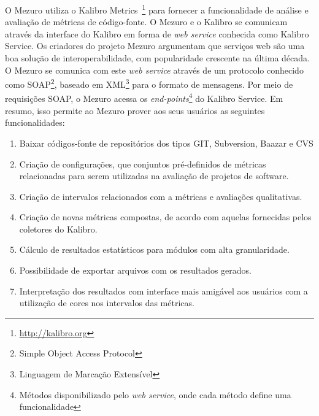 
O Mezuro utiliza o Kalibro Metrics~\footnote{\url{http://kalibro.org}} para fornecer a funcionalidade de análise e avaliação de métricas de código-fonte. O Mezuro e o Kalibro se comunicam através da interface do Kalibro em forma de \textit{web service} conhecida como Kalibro Service.
%
Os criadores do projeto Mezuro argumentam que serviços web são uma boa solução de interoperabilidade, com popularidade crescente na última década. O Mezuro se comunica com este \textit{web service} através de um protocolo conhecido como SOAP\footnote{Simple Object Access Protocol}, baseado em XML\footnote{Linguagem de Marcação Extensível} para o formato de mensagens.
%
Por meio de requisições SOAP, o Mezuro acessa os \textit{end-points}\footnote{Métodos disponibilizado pelo \textit{web service}, onde cada método define uma funcionalidade} do Kalibro Service. Em resumo, isso permite ao Mezuro prover aos seus usuários as seguintes funcionalidades:

\begin{enumerate}
\item Baixar códigos-fonte de repositórios dos tipos GIT, Subversion, Baazar e CVS
\item Criação de configurações, que conjuntos pré-definidos de métricas relacionadas para serem utilizadas na avaliação de projetos de software.
\item Criação de intervalos relacionados com a métricas e avaliações qualitativas.
\item Criação de novas métricas compostas, de acordo com aquelas fornecidas pelos coletores do Kalibro.
\item Cálculo de resultados estatísticos para módulos com alta granularidade.
\item Possibilidade de exportar arquivos com os resultados gerados.
\item Interpretação dos resultados com interface mais amigável aos usuários com a utilização de cores nos intervalos das métricas.
\end{enumerate}



